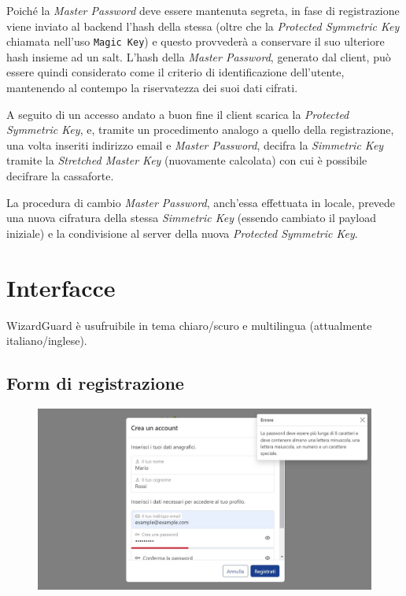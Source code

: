 \documentclass[a4paper]{report}
\begin{document}
Poiché la \textit{Master Password} deve essere mantenuta segreta, in fase di registrazione viene inviato al backend l'hash della stessa (oltre che la \textit{Protected Symmetric Key} chiamata nell'uso \texttt{Magic Key}) e questo provvederà a conservare il suo ulteriore hash insieme ad un salt. L'hash della \textit{Master Password}, generato dal client, può essere quindi considerato come il criterio di identificazione dell'utente, mantenendo al contempo la riservatezza dei suoi dati cifrati.

A seguito di un accesso andato a buon fine il client scarica la \textit{Protected Symmetric Key}, e, tramite un procedimento analogo a quello della registrazione, una volta inseriti indirizzo email e \textit{Master Password}, decifra la \textit{Simmetric Key} tramite la \textit{Stretched Master Key} (nuovamente calcolata) con cui è possibile decifrare la cassaforte.

La procedura di cambio \textit{Master Password}, anch'essa effettuata in locale, prevede una nuova cifratura della stessa \textit{Simmetric Key} (essendo cambiato il payload iniziale) e la condivisione al server della nuova \textit{Protected Symmetric Key}.

\chapter{Interfacce}

WizardGuard è usufruibile in tema chiaro/scuro e multilingua (attualmente italiano/inglese).

\section{Form di registrazione}
    \begin{figure}[H]
        \centering
        \includegraphics[width=1.0\textwidth]{figures/interfaces/signup}
    \end{figure}
\end{document}
